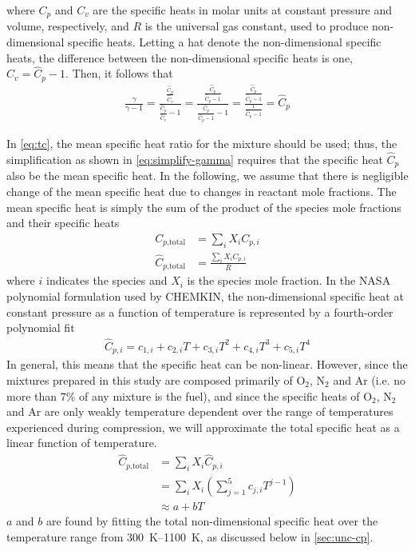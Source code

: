 \documentclass[../main.tex]{subfiles}
\begin{document}
where $C_p$ and $C_v$ are the specific heats in molar units at constant
pressure and volume, respectively, and $R$ is the universal gas constant,
used to produce non-dimensional specific heats. Letting a hat denote the
non-dimensional specific heats, the difference between the non-dimensional
specific heats is one, $\hat{C}_v = \hat{C}_p - 1$. Then, it follows that
%
\begin{align}
\label{eq:simplify-gamma}
\frac{\gamma}{\gamma - 1} = \frac{\frac{\hat{C}_p}{\hat{C}_v}}{\frac{\hat{C}_p}{\hat{C}_v} - 1}
= \frac{\frac{\hat{C}_p}{\hat{C}_p - 1}}{\frac{\hat{C}_p}{\hat{C}_p - 1} - 1}
= \frac{\frac{\hat{C}_p}{\hat{C}_p - 1}}{\frac{1}{\hat{C}_p - 1}}
= \hat{C}_p
\end{align}

In \autoref{eq:tc}, the mean specific heat ratio for the mixture
should be used; thus, the simplification as shown in \autoref{eq:simplify-gamma}
requires that the specific heat $\hat{C}_p$ also be the mean specific
heat. In the following, we assume that there is negligible
change of the mean specific heat due to changes in reactant
mole fractions. The mean specific heat is simply the sum of the product of
the species mole fractions and their specific heats
%
\begin{subequations}
\label{eq:cp}
\begin{align}
C_{p\text{,total}} &= \sum_i X_i C_{p,i} \\
\hat{C}_{p\text{,total}} &= \frac{\sum_i X_i C_{p,i}}{R}
\end{align}
\end{subequations}
%
where $i$ indicates the species and $X_i$ is the species mole fraction.
In the NASA polynomial formulation used by CHEMKIN, the non-dimensional specific
heat at constant pressure as a function of temperature is represented by a
fourth-order polynomial fit
%
\begin{align}
\hat{C}_{p,i} = c_{1,i} + c_{2,i} T + c_{3,i} T^2 + c_{4,i} T^3 + c_{5,i} T^4
\end{align}
%
In general, this means that the specific heat can be non-linear. However,
since the mixtures prepared in this study are composed primarily of
O$_2$, N$_2$ and Ar (i.e. no more than 7\% of any mixture is the
fuel), and since the specific heats of O$_2$, N$_2$ and Ar are only weakly
temperature dependent over the range of temperatures experienced during
compression, we will approximate the total specific heat as a linear function
of temperature.
%
\begin{equation}%
\label{eq:cp-total}
\begin{split}
\hat{C}_{p\text{,total}} &= \sum_i X_i \hat{C}_{p,i} \\
&= \sum_i X_i \left( \sum_{j=1}^5 c_{j,i} T^{j-1} \right) \\
&\approx a + b T
\end{split}
\end{equation}
%
$a$ and $b$ are found by fitting the total non-dimensional specific heat
over the temperature range from \SIrange{300}{1100}{\kelvin}, as discussed below in
\autoref{sec:unc-cp}.
\end{document}
